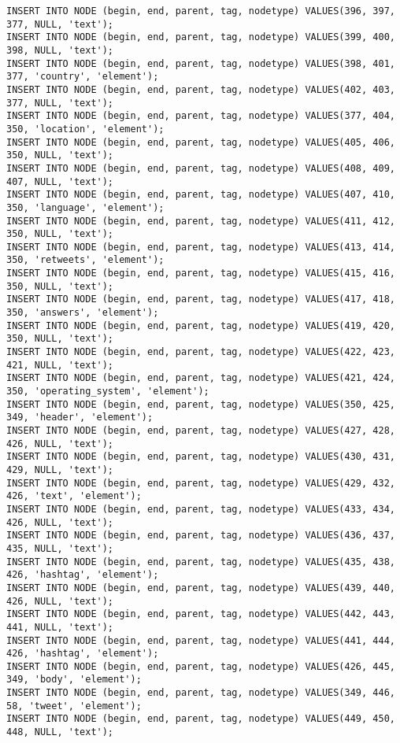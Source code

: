 \begin{verbatim}
INSERT INTO NODE (begin, end, parent, tag, nodetype) VALUES(396, 397, 377, NULL, 'text');
INSERT INTO NODE (begin, end, parent, tag, nodetype) VALUES(399, 400, 398, NULL, 'text');
INSERT INTO NODE (begin, end, parent, tag, nodetype) VALUES(398, 401, 377, 'country', 'element');
INSERT INTO NODE (begin, end, parent, tag, nodetype) VALUES(402, 403, 377, NULL, 'text');
INSERT INTO NODE (begin, end, parent, tag, nodetype) VALUES(377, 404, 350, 'location', 'element');
INSERT INTO NODE (begin, end, parent, tag, nodetype) VALUES(405, 406, 350, NULL, 'text');
INSERT INTO NODE (begin, end, parent, tag, nodetype) VALUES(408, 409, 407, NULL, 'text');
INSERT INTO NODE (begin, end, parent, tag, nodetype) VALUES(407, 410, 350, 'language', 'element');
INSERT INTO NODE (begin, end, parent, tag, nodetype) VALUES(411, 412, 350, NULL, 'text');
INSERT INTO NODE (begin, end, parent, tag, nodetype) VALUES(413, 414, 350, 'retweets', 'element');
INSERT INTO NODE (begin, end, parent, tag, nodetype) VALUES(415, 416, 350, NULL, 'text');
INSERT INTO NODE (begin, end, parent, tag, nodetype) VALUES(417, 418, 350, 'answers', 'element');
INSERT INTO NODE (begin, end, parent, tag, nodetype) VALUES(419, 420, 350, NULL, 'text');
INSERT INTO NODE (begin, end, parent, tag, nodetype) VALUES(422, 423, 421, NULL, 'text');
INSERT INTO NODE (begin, end, parent, tag, nodetype) VALUES(421, 424, 350, 'operating_system', 'element');
INSERT INTO NODE (begin, end, parent, tag, nodetype) VALUES(350, 425, 349, 'header', 'element');
INSERT INTO NODE (begin, end, parent, tag, nodetype) VALUES(427, 428, 426, NULL, 'text');
INSERT INTO NODE (begin, end, parent, tag, nodetype) VALUES(430, 431, 429, NULL, 'text');
INSERT INTO NODE (begin, end, parent, tag, nodetype) VALUES(429, 432, 426, 'text', 'element');
INSERT INTO NODE (begin, end, parent, tag, nodetype) VALUES(433, 434, 426, NULL, 'text');
INSERT INTO NODE (begin, end, parent, tag, nodetype) VALUES(436, 437, 435, NULL, 'text');
INSERT INTO NODE (begin, end, parent, tag, nodetype) VALUES(435, 438, 426, 'hashtag', 'element');
INSERT INTO NODE (begin, end, parent, tag, nodetype) VALUES(439, 440, 426, NULL, 'text');
INSERT INTO NODE (begin, end, parent, tag, nodetype) VALUES(442, 443, 441, NULL, 'text');
INSERT INTO NODE (begin, end, parent, tag, nodetype) VALUES(441, 444, 426, 'hashtag', 'element');
INSERT INTO NODE (begin, end, parent, tag, nodetype) VALUES(426, 445, 349, 'body', 'element');
INSERT INTO NODE (begin, end, parent, tag, nodetype) VALUES(349, 446, 58, 'tweet', 'element');
INSERT INTO NODE (begin, end, parent, tag, nodetype) VALUES(449, 450, 448, NULL, 'text');

\end{verbatim}
